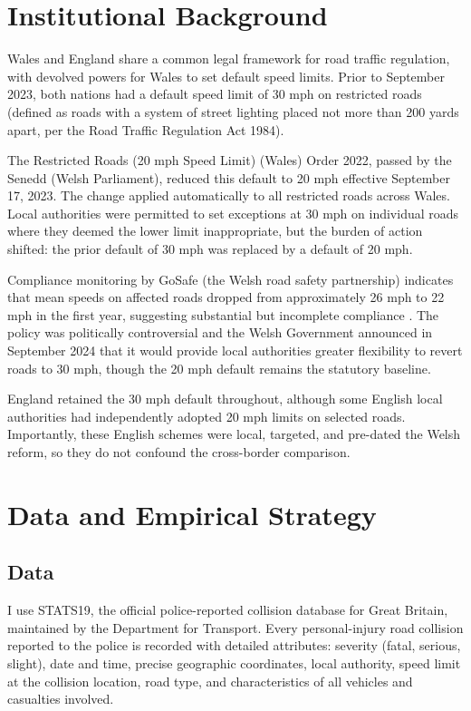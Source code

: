 \documentclass[12pt]{article}
\begin{document}
\section{Institutional Background}

Wales and England share a common legal framework for road traffic regulation, with devolved powers for Wales to set default speed limits. Prior to September 2023, both nations had a default speed limit of 30 mph on restricted roads (defined as roads with a system of street lighting placed not more than 200 yards apart, per the Road Traffic Regulation Act 1984).

The Restricted Roads (20 mph Speed Limit) (Wales) Order 2022, passed by the Senedd (Welsh Parliament), reduced this default to 20 mph effective September 17, 2023. The change applied automatically to all restricted roads across Wales. Local authorities were permitted to set exceptions at 30 mph on individual roads where they deemed the lower limit inappropriate, but the burden of action shifted: the prior default of 30 mph was replaced by a default of 20 mph.

Compliance monitoring by GoSafe (the Welsh road safety partnership) indicates that mean speeds on affected roads dropped from approximately 26 mph to 22 mph in the first year, suggesting substantial but incomplete compliance \citep{GoSafe2024}. The policy was politically controversial and the Welsh Government announced in September 2024 that it would provide local authorities greater flexibility to revert roads to 30 mph, though the 20 mph default remains the statutory baseline.

England retained the 30 mph default throughout, although some English local authorities had independently adopted 20 mph limits on selected roads. Importantly, these English schemes were local, targeted, and pre-dated the Welsh reform, so they do not confound the cross-border comparison.


\section{Data and Empirical Strategy}

\subsection{Data}

I use STATS19, the official police-reported collision database for Great Britain, maintained by the Department for Transport. Every personal-injury road collision reported to the police is recorded with detailed attributes: severity (fatal, serious, slight), date and time, precise geographic coordinates, local authority, speed limit at the collision location, road type, and characteristics of all vehicles and casualties involved.
\end{document}
